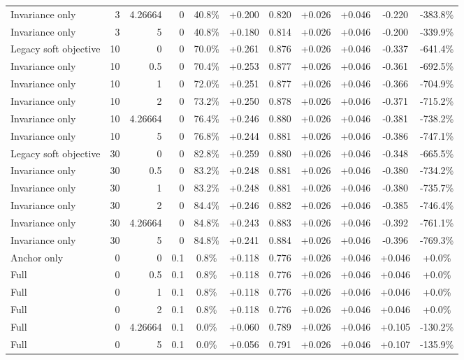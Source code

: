 \begin{table}[htbp]
\begin{tabular}{lrrrccccccc}
Invariance only & 3 & 4.26664 & 0 & 40.8\% & +0.200 & 0.820 & +0.026 & +0.046 & -0.220 & -383.8\% \\
Invariance only & 3 & 5 & 0 & 40.8\% & +0.180 & 0.814 & +0.026 & +0.046 & -0.200 & -339.9\% \\
Legacy soft objective & 10 & 0 & 0 & 70.0\% & +0.261 & 0.876 & +0.026 & +0.046 & -0.337 & -641.4\% \\
Invariance only & 10 & 0.5 & 0 & 70.4\% & +0.253 & 0.877 & +0.026 & +0.046 & -0.361 & -692.5\% \\
Invariance only & 10 & 1 & 0 & 72.0\% & +0.251 & 0.877 & +0.026 & +0.046 & -0.366 & -704.9\% \\
Invariance only & 10 & 2 & 0 & 73.2\% & +0.250 & 0.878 & +0.026 & +0.046 & -0.371 & -715.2\% \\
Invariance only & 10 & 4.26664 & 0 & 76.4\% & +0.246 & 0.880 & +0.026 & +0.046 & -0.381 & -738.2\% \\
Invariance only & 10 & 5 & 0 & 76.8\% & +0.244 & 0.881 & +0.026 & +0.046 & -0.386 & -747.1\% \\
Legacy soft objective & 30 & 0 & 0 & 82.8\% & +0.259 & 0.880 & +0.026 & +0.046 & -0.348 & -665.5\% \\
Invariance only & 30 & 0.5 & 0 & 83.2\% & +0.248 & 0.881 & +0.026 & +0.046 & -0.380 & -734.2\% \\
Invariance only & 30 & 1 & 0 & 83.2\% & +0.248 & 0.881 & +0.026 & +0.046 & -0.380 & -735.7\% \\
Invariance only & 30 & 2 & 0 & 84.4\% & +0.246 & 0.882 & +0.026 & +0.046 & -0.385 & -746.4\% \\
Invariance only & 30 & 4.26664 & 0 & 84.8\% & +0.243 & 0.883 & +0.026 & +0.046 & -0.392 & -761.1\% \\
Invariance only & 30 & 5 & 0 & 84.8\% & +0.241 & 0.884 & +0.026 & +0.046 & -0.396 & -769.3\% \\
Anchor only & 0 & 0 & 0.1 & 0.8\% & +0.118 & 0.776 & +0.026 & +0.046 & +0.046 & +0.0\% \\
Full & 0 & 0.5 & 0.1 & 0.8\% & +0.118 & 0.776 & +0.026 & +0.046 & +0.046 & +0.0\% \\
Full & 0 & 1 & 0.1 & 0.8\% & +0.118 & 0.776 & +0.026 & +0.046 & +0.046 & +0.0\% \\
Full & 0 & 2 & 0.1 & 0.8\% & +0.118 & 0.776 & +0.026 & +0.046 & +0.046 & +0.0\% \\
Full & 0 & 4.26664 & 0.1 & 0.0\% & +0.060 & 0.789 & +0.026 & +0.046 & +0.105 & -130.2\% \\
Full & 0 & 5 & 0.1 & 0.0\% & +0.056 & 0.791 & +0.026 & +0.046 & +0.107 & -135.9\% \\

\end{tabular}
\end{table}
